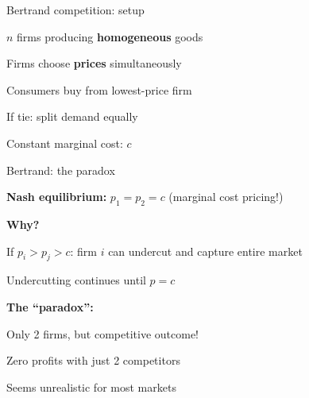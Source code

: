 \documentclass[notes,11pt, aspectratio=169]{beamer}
\newenvironment{wideitemize}{\itemize\addtolength{\itemsep}{10pt}}{\enditemize}
\begin{document}
\begin{frame}{Bertrand competition: setup}
	\begin{wideitemize}
		\item $n$ firms producing \textbf{homogeneous} goods
		\item Firms choose \textbf{prices} simultaneously
		\item Consumers buy from lowest-price firm
		\item If tie: split demand equally
		\item Constant marginal cost: $c$
	\end{wideitemize}
\end{frame}

\begin{frame}{Bertrand: the paradox}
	\begin{wideitemize}
		\item \textbf{Nash equilibrium:} $p_1 = p_2 = c$ (marginal cost pricing!)
		\item \textbf{Why?}
		\begin{wideitemize}
			\vspace{5pt}
			\item If $p_i > p_j > c$: firm $i$ can undercut and capture entire market
			\item Undercutting continues until $p = c$
		\end{wideitemize}
		\item \textbf{The ``paradox'':}
		\begin{wideitemize}
			\vspace{5pt}
			\item Only 2 firms, but competitive outcome!
			\item Zero profits with just 2 competitors
			\item Seems unrealistic for most markets
		\end{wideitemize}
	\end{wideitemize}
\end{frame}
\end{document}
